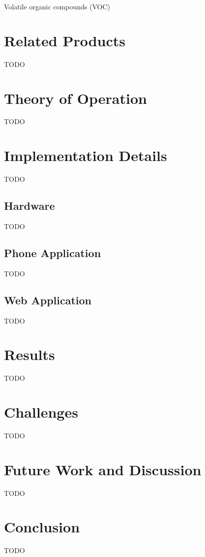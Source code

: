 \documentclass{sigchi}
\begin{document}
Volatile organic compounds (VOC)

\section{Related Products}
TODO

\section{Theory of Operation}
TODO

\section{Implementation Details}
TODO

\subsection{Hardware}
TODO

\subsection{Phone Application}
TODO

\subsection{Web Application}
TODO

\section{Results}
TODO

\section{Challenges}
TODO

\section{Future Work and Discussion}
TODO

\section{Conclusion}
TODO

\balance{}



\end{document}
